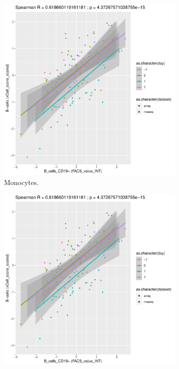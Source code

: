 \begin{figure}
    \centering
    \begin{subfigure}[b]{0.43\textwidth}
        \centering
        \includegraphics[width=1.0\textwidth,page=6]{mainmatter/figures/chapter_03/validate_xCell_estimates.cell_type_pairs.pdf}
        \caption{Monocytes.}
    \end{subfigure}
    \bigskip\vfill
    \begin{subfigure}[b]{0.43\textwidth}
        \centering
        \includegraphics[width=1.0\textwidth,page=3]{mainmatter/figures/chapter_03/validate_xCell_estimates.cell_type_pairs.pdf}

\end{subfigure}
\end{figure}

